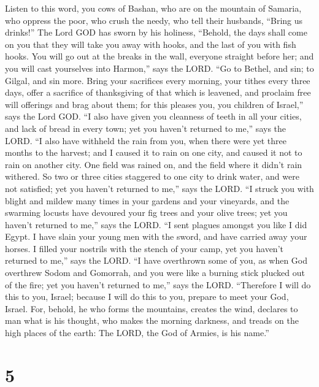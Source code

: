  Listen to this word, you cows of Bashan, who are on the
mountain of Samaria, who oppress the poor, who crush the needy, who tell
their husbands, ``Bring us drinks!''  The Lord GOD has sworn
by his holiness, ``Behold, the days shall come on you that they will
take you away with hooks, and the last of you with fish hooks.
 You will go out at the breaks in the wall, everyone
straight before her; and you will cast yourselves into Harmon,'' says
the LORD.  ``Go to Bethel, and sin; to Gilgal, and sin more.
Bring your sacrifices every morning, your tithes every three days,
 offer a sacrifice of thanksgiving of that which is
leavened, and proclaim free will offerings and brag about them; for this
pleases you, you children of Israel,'' says the Lord GOD. 
``I also have given you cleanness of teeth in all your cities, and lack
of bread in every town; yet you haven't returned to me,'' says the LORD.
 ``I also have withheld the rain from you, when there were
yet three months to the harvest; and I caused it to rain on one city,
and caused it not to rain on another city. One field was rained on, and
the field where it didn't rain withered.  So two or three
cities staggered to one city to drink water, and were not satisfied; yet
you haven't returned to me,'' says the LORD.  ``I struck you
with blight and mildew many times in your gardens and your vineyards,
and the swarming locusts have devoured your fig trees and your olive
trees; yet you haven't returned to me,'' says the LORD. 
``I sent plagues amongst you like I did Egypt. I have slain your young
men with the sword, and have carried away your horses. I filled your
nostrils with the stench of your camp, yet you haven't returned to me,''
says the LORD.  ``I have overthrown some of you, as when
God overthrew Sodom and Gomorrah, and you were like a burning stick
plucked out of the fire; yet you haven't returned to me,'' says the
LORD.  ``Therefore I will do this to you, Israel; because I
will do this to you, prepare to meet your God, Israel. 
For, behold, he who forms the mountains, creates the wind, declares to
man what is his thought, who makes the morning darkness, and treads on
the high places of the earth: The LORD, the God of Armies, is his
name.''

\hypertarget{section-4}{%
\section{5}\label{section-4}}

